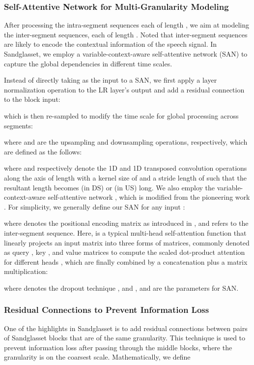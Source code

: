 \documentclass{article}
\begin{document}
\subsubsection{Self-Attentive Network for Multi-Granularity Modeling}
After processing the intra-segment sequences each of length , we aim at modeling the inter-segment sequences, each of length . Noted that inter-segment sequences are likely to encode the contextual information of the speech signal. In Sandglasset, we employ a variable-context-aware self-attentive network (SAN) to capture the global dependencies in different time scales. 
\par
Instead of directly taking  as the input to a SAN, we first apply a layer normalization operation  to the LR layer's output and add a residual connection to the block input:

which is then re-sampled to modify the time scale for global processing across segments:

where  and  are the upsampling and downsampling operations, respectively, which are defined as the follows:

where  and  respectively denote the 1D and 1D transposed convolution operations along the axis of length  with a kernel size of  and a stride length of  such that the resultant length becomes  (in DS) or  (in US) long.
We also employ the variable-context-aware self-attentive network , which is modified from the pioneering work \cite{vaswani2017attention}. For simplicity, we generally define our SAN for any input :

where  denotes the positional encoding matrix as introduced in \cite{vaswani2017attention}, and  refers to the inter-segment sequence. Here,  is a typical multi-head self-attention function that linearly projects an input matrix  into three forms of matrices, commonly denoted as query , key , and value  matrices to compute the scaled dot-product attention for different heads , which are finally combined by a concatenation plus a matrix multiplication:

where  denotes the dropout technique \cite{srivastava2014dropout}, and ,  and  are the parameters for SAN.

\subsubsection{Residual Connections to Prevent Information Loss}
One of the highlights in Sandglasset is to add residual connections between pairs of Sandglasset blocks that are of the same granularity. This technique is used to prevent information loss after passing through the middle blocks, where the granularity is on the coarsest scale. Mathematically, we define
\end{document}
